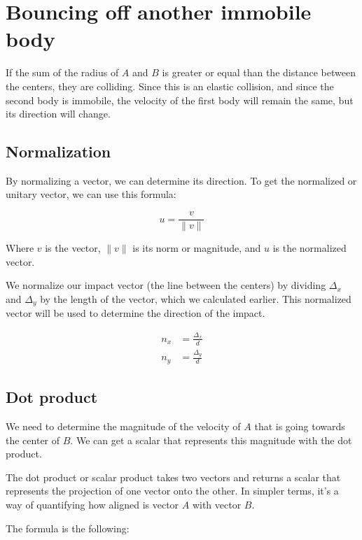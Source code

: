 \documentclass{amsart}
\begin{document}
\newpage

\section{Bouncing off another immobile body}

If the sum of the radius of $A$ and $B$ is greater or equal than the distance
between the centers, they are colliding. Since this is an elastic collision, and
since the second body is immobile, the velocity of the first body will remain
the same, but its direction will change.

\subsection{Normalization}

By normalizing a vector, we can determine its direction. To get the normalized
or unitary vector, we can use this formula:

\begin{displaymath}
  u = \frac{v}{\|v\|}
\end{displaymath}

Where $v$ is the vector, $\|v\|$ is its norm or magnitude, and $u$ is the
normalized vector.

We normalize our impact vector (the line between the centers) by dividing
$\Delta_x$ and $\Delta_y$ by the length of the vector, which we calculated
earlier. This normalized vector will be used to determine the direction of the
impact.

\begin{align*}
  n_x &= \frac{\Delta_x}{d} \\
  n_y &= \frac{\Delta_y}{d}
\end{align*}

\subsection{Dot product}

We need to determine the magnitude of the velocity of $A$ that is going towards
the center of $B$. We can get a scalar that represents this magnitude with the
dot product.

The dot product or scalar product takes two vectors and returns a scalar that
represents the projection of one vector onto the other. In simpler terms, it's a
way of quantifying how aligned is vector $A$ with vector $B$.

The formula is the following:
\end{document}
